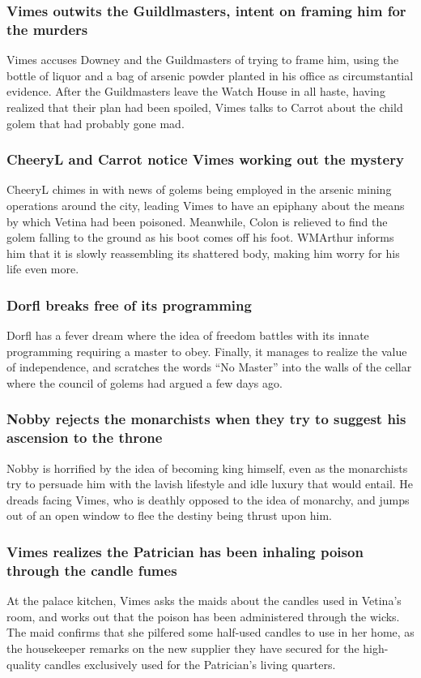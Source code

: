 \subsubsection{\Gls{Vimes} outwits the Guildlmasters, intent on framing him for the murders}
\Gls{Vimes} accuses \Gls{Downey} and the Guildmasters of trying to frame him, using the bottle of
liquor and a bag of arsenic powder planted in his office as circumstantial evidence. After the
Guildmasters leave the Watch House in all haste, having realized that their plan had been spoiled,
\Gls{Vimes} talks to \Gls{Carrot} about the child golem that had probably gone mad.

\subsubsection{\Gls{CheeryL} and \Gls{Carrot} notice \Gls{Vimes} working out the mystery}
\Gls{CheeryL} chimes in with news of golems being employed in the arsenic mining operations around
the city, leading \Gls{Vimes} to have an epiphany about the means by which \Gls{Vetina} had been
poisoned. Meanwhile, \Gls{Colon} is relieved to find the golem falling to the ground as his boot
comes off his foot. \Gls{WMArthur} informs him that it is slowly reassembling its shattered body,
making him worry for his life even more.

\subsubsection{\Gls{Dorfl} breaks free of its programming}
\Gls{Dorfl} has a fever dream where the idea of freedom battles with its innate programming
requiring a master to obey. Finally, it manages to realize the value of independence, and scratches
the words ``No Master'' into the walls of the cellar where the council of golems had argued a few
days ago.

\subsubsection{\Gls{Nobby} rejects the monarchists when they try to suggest his ascension to the
    throne}
\Gls{Nobby} is horrified by the idea of becoming king himself, even as the monarchists try to
persuade him with the lavish lifestyle and idle luxury that would entail. He dreads facing
\Gls{Vimes}, who is deathly opposed to the idea of monarchy, and jumps out of an open window to flee
the destiny being thrust upon him.

\subsubsection{\Gls{Vimes} realizes the Patrician has been inhaling poison through the candle fumes}
At the palace kitchen, \Gls{Vimes} asks the maids about the candles used in \Gls{Vetina}'s room,
and works out that the poison has been administered through the wicks. The maid confirms that she
pilfered some half-used candles to use in her home, as the housekeeper remarks on the new supplier
they have secured for the high-quality candles exclusively used for the Patrician's living quarters.

